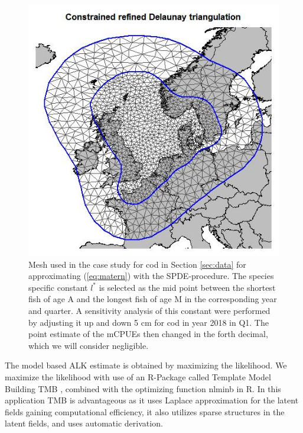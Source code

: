 \documentclass[a4paper 12pt]{article}
\numberwithin{equation}{section}
\begin{document}
\clearpage
\begin{figure}[h!]
\begin{center}
\includegraphics[scale=0.5]{figures/mesh.jpeg}
 \caption{Mesh used in the case study for cod in Section \ref{sec:data} for approximating (\ref{eq:matern}) with the SPDE-procedure. The species specific constant $l^*$ is selected as the mid point between the shortest fish of age A and the longest fish of age M in the corresponding year and quarter. A sensitivity analysis of this constant were performed by adjusting it up and down 5 cm for cod in year 2018 in Q1. The point estimate of the mCPUEs then changed in the forth decimal, which we will consider negligible.}\label{fig:mesh}
\end{center}
\end{figure}


The model based ALK estimate is obtained by maximizing the likelihood. We maximize the likelihood with use of an R-Package called Template Model Building {\sffamily TMB} \citep{kristensen2015tmb}, combined with the optimizing function {\sffamily nlminb} in R. In this application {\sffamily TMB} is advantageous as it uses Laplace approximation for the latent fields gaining computational efficiency, it also utilizes sparse structures in the latent fields, and uses automatic derivation. 
\end{document}
